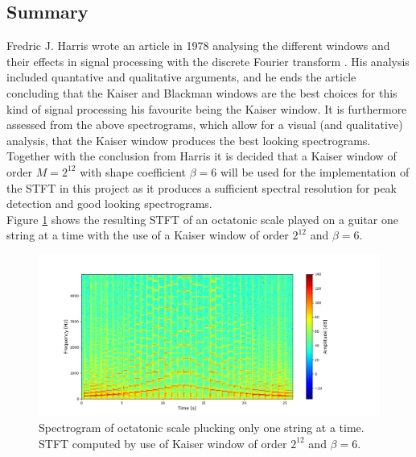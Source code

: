 \subsection{Summary}
Fredric J. Harris wrote an article in 1978 analysing the different windows and their effects in signal processing with the discrete Fourier transform \cite{page 82, fredric_harris}. His analysis included quantative and qualitative arguments, and he ends the article concluding that the Kaiser and Blackman windows are the best choices for this kind of signal processing his favourite being the Kaiser window. It is furthermore assessed from the above spectrograms, which allow for a visual (and qualitative) analysis, that the Kaiser window produces the best looking spectrograms. Together with the conclusion from Harris it is decided that a Kaiser window of order $M=2^{12}$ with shape coefficient $\beta = 6$ will be used for the implementation of the STFT in this project as it produces a sufficient spectral resolution for peak detection and good looking spectrograms.\\
Figure \ref{fig:STFT_test_signal} shows the resulting STFT of an octatonic scale played on a guitar one string at a time with the use of a Kaiser window of order $2^{12}$ and $\beta = 6$.

\begin{figure}[H]
\centering
\includegraphics[width = 1.1\textwidth]{figures/validation/stft/scale.png}
\caption{Spectrogram of octatonic scale plucking only one string at a time. STFT computed by use of Kaiser window of order $2^{12}$ and $\beta = 6$.}
\label{fig:STFT_test_signal}
\end{figure}